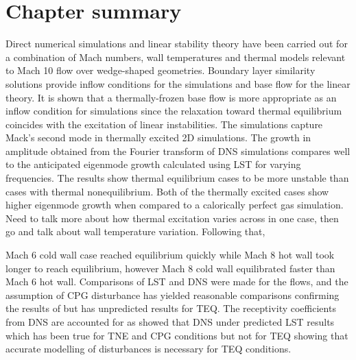 







\section{Chapter summary}

Direct numerical simulations and linear stability theory have been carried out for a combination of Mach numbers, wall temperatures and thermal models relevant to Mach 10 flow over wedge-shaped geometries. Boundary layer similarity solutions provide inflow conditions for the simulations and base flow for the linear theory. It is shown that a thermally-frozen base flow is more appropriate as an inflow condition for simulations since the relaxation toward thermal equilibrium coincides with the excitation of linear instabilities. The simulations capture Mack's second mode in thermally excited 2D simulations. The growth in amplitude obtained from the Fourier transform of DNS simulations compares well to the anticipated eigenmode growth calculated using LST for varying frequencies. The results show thermal equilibrium cases to be more unstable than cases with thermal nonequilibrium. Both of the thermally excited cases show higher eigenmode growth when compared to a calorically perfect gas simulation. Need to talk more about how thermal excitation varies across in one case, then go and talk about wall temperature variation. Following that, 

Mach 6 cold wall case reached equilibrium quickly while Mach 8 hot wall took longer to reach equilibrium, however Mach 8 cold wall equilibrated faster than Mach 6 hot wall. Comparisons of \gls{LST} and \gls{DNS} were made for the flows, and the assumption of \gls{CPG} disturbance has yielded reasonable comparisons confirming the results of \cite{Wartemann2019} but has unpredicted results for \gls{TEQ}. The receptivity coefficients from \gls{DNS} are accounted for as \citep{Zhong2012} showed that DNS under predicted \gls{LST} results which has been true for \gls{TNE} and \gls{CPG} conditions but not for \gls{TEQ} showing that accurate modelling of disturbances is necessary for \gls{TEQ} conditions. 

